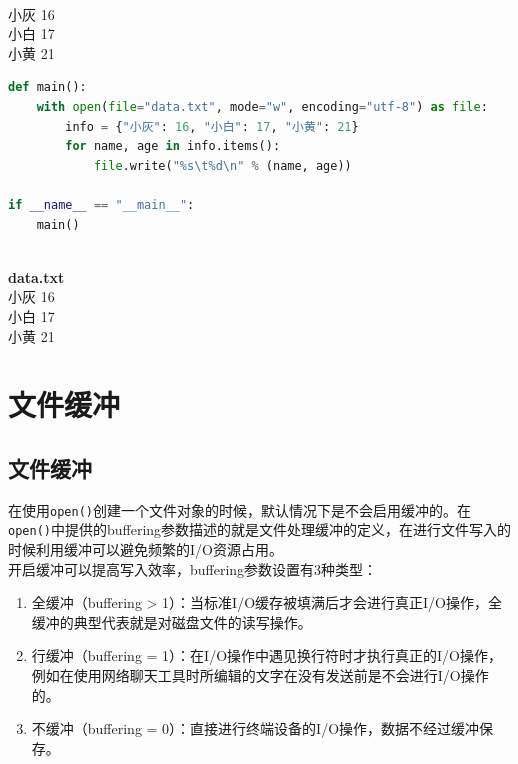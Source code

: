 \begin{tcolorbox}
	 \\
	小灰	16 \\
    小白	17 \\
    小黄	21
\end{tcolorbox}

\begin{lstlisting}[language=Python]
def main():
    with open(file="data.txt", mode="w", encoding="utf-8") as file:
        info = {"小灰": 16, "小白": 17, "小黄": 21}
        for name, age in info.items():
            file.write("%s\t%d\n" % (name, age))

if __name__ == "__main__":
    main()
\end{lstlisting}

\begin{tcolorbox}
     \\
    \textbf{data.txt} \\
    小灰	16 \\
    小白	17 \\
    小黄	21
\end{tcolorbox}

\newpage

\section{文件缓冲}

\subsection{文件缓冲}

在使用\lstinline|open()|创建一个文件对象的时候，默认情况下是不会启用缓冲的。在\lstinline|open()|中提供的buffering参数描述的就是文件处理缓冲的定义，在进行文件写入的时候利用缓冲可以避免频繁的I/O资源占用。 \\

开启缓冲可以提高写入效率，buffering参数设置有3种类型：

\begin{enumerate}
    \item 全缓冲（buffering > 1）：当标准I/O缓存被填满后才会进行真正I/O操作，全缓冲的典型代表就是对磁盘文件的读写操作。
    
    \item 行缓冲（buffering = 1）：在I/O操作中遇见换行符时才执行真正的I/O操作，例如在使用网络聊天工具时所编辑的文字在没有发送前是不会进行I/O操作的。
    
    \item 不缓冲（buffering = 0）：直接进行终端设备的I/O操作，数据不经过缓冲保存。
\end{enumerate}

